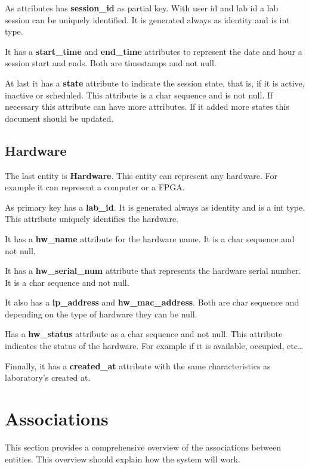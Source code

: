 \documentclass[a4paper,twoside,11pt]{article}
\begin{document}
As attributes has \textbf{session\_id} as partial key. With user id and lab id a lab session can be uniquely identified. It is generated always as identity and is int type.

It has a \textbf{start\_time} and \textbf{end\_time} attributes to represent the date and hour a session start and ends. Both are timestamps and not null.

At last it has a \textbf{state} attribute to indicate the session state, that is, if it is active, inactive or scheduled. This attribute is a char sequence and is not null. If necessary this attribute can have more attributes. If it added more states this document should be updated.

\subsection*{Hardware}
The last entity is \textbf{Hardware}. This entity can represent any hardware. For example it can represent a computer or a FPGA.

As primary key has a \textbf{lab\_id}. It is generated always as identity and is a int type. This attribute uniquely identifies the hardware.

It has a \textbf{hw\_name} attribute for the hardware name. It is a char sequence and not null. 

It has a \textbf{hw\_serial\_num} attribute that represents the hardware serial number. It is a char sequence and not null. 

It also has a \textbf{ip\_address} and \textbf{hw\_mac\_address}. Both are char sequence and depending on the type of hardware they can be null.

Has a \textbf{hw\_status} attribute as a char sequence and not null. This attribute indicates the status of the hardware. For example if it is available, occupied, etc\dots

Finnally, it has a \textbf{created\_at} attribute with the same characteristics as laboratory's created at.

\section*{Associations}
This section provides a comprehensive overview of the associations between entities. This overview should explain how the system will work.
\end{document}
